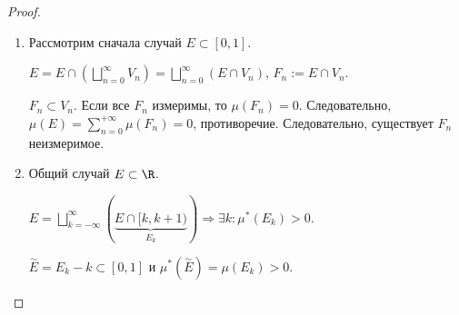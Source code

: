 \begin{proof}
    \begin{enumerate}
        \item Рассмотрим сначала случай $E \subset [0, 1]$. 

        $E = E \cap (\bigsqcup_{n = 0}^{\infty}V_{n}) = \bigsqcup_{n = 0}^{\infty}(E \cap V_{n})$, $F_{n} := E \cap V_{n}$.
    
        $F_{n} \subset V_{n}$. Если все $F_{n}$ измеримы, то $\mu(F_{n}) = 0$. Следовательно, $\mu(E) = \sum_{n = 0}^{+\infty}\mu(F_{n}) = 0$, противоречие. Следовательно, существует $F_{n}$ неизмеримое.

        \item Общий случай $E \subset \R$.
    
        $E = \bigsqcup_{k = -\infty}^{\infty}(\underbrace{E \cap [k, k + 1)}_{E_{k}}) \Rightarrow \exists k: \mu^{*}(E_{k}) > 0$.
    
        $\overset{\sim}{E} = E_{k} - k \subset [0, 1]$ и $\mu^{*}(\overset{\sim}{E}) = \mu(E_{k}) > 0$.
    \end{enumerate}
\end{proof}
